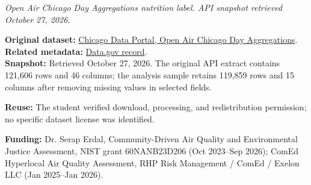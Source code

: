 \documentclass[11pt]{article}
\begin{document}
\begin{center}
  \resizebox{11cm}{!}{}
\end{center}
\noindent\small\textit{Open Air Chicago Day Aggregations nutrition label. API snapshot retrieved October 27, 2026.}\normalsize\par

\noindent\textbf{Original dataset:} \href{https://data.cityofchicago.org/Health-Human-Services/Open-Air-Chicago-Day-Aggregations/rtmx-vkjr/about_data}{Chicago Data Portal, Open Air Chicago Day Aggregations}.\\
\textbf{Related metadata:} \href{https://catalog.data.gov/dataset/open-air-chicago-day-aggregations}{Data.gov record}.\\
\textbf{Snapshot:} Retrieved October 27, 2026. The original API extract contains 121,606 rows and 46 columns; the analysis sample retains 119,859 rows and 15 columns after removing missing values in selected fields.\par
\textbf{Reuse:} The student verified download, processing, and redistribution permission; no specific dataset license was identified.\par
\textbf{Funding:} Dr. Serap Erdal, Community-Driven Air Quality and Environmental Justice Assessment, NIST grant 60NANB23D206 (Oct 2023--Sep 2026); ComEd Hyperlocal Air Quality Assessment, RHP Risk Management / ComEd / Exelon LLC (Jan 2025--Jan 2026).
\end{document}

